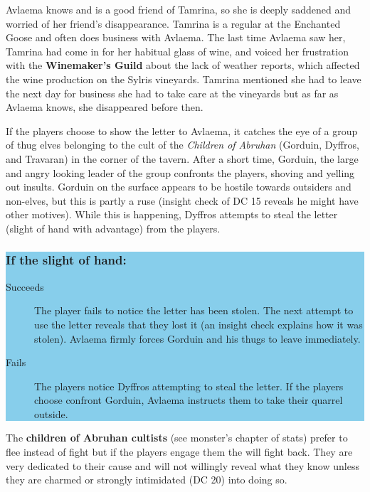 \begin{multicols*}{2}
Avlaema knows and is a good friend of Tamrina, so she is deeply saddened and worried of her friend's disappearance. Tamrina is a regular at the Enchanted Goose and often does business with Avlaema. The last time Avlaema saw her, Tamrina had come in for her habitual glass of wine, and voiced her frustration with the \textbf{Winemaker's Guild} about the lack of weather reports, which affected the wine production on the Sylris vineyards. Tamrina mentioned she had to leave the next day for business she had to take care at the vineyards but as far as Avlaema knows, she disappeared before then.

If the players choose to show the letter to Avlaema, it catches the eye of a group of thug elves belonging to the cult of the \emph{Children of Abruhan} (Gorduin, Dyffros, and Travaran) in the corner of the tavern. After a short time, Gorduin, the large and angry looking leader of the group confronts the players, shoving and yelling out insults. Gorduin on the surface appears to be hostile towards outsiders and non-elves, but this is partly a ruse (insight check of DC 15 reveals he might have other motives). While this is happening, Dyffros attempts to steal the letter (slight of hand with advantage) from the players.

\colorbox{SkyBlue}{\begin{minipage}{0.4\textwidth}
		\subsubsection*{If the slight of hand:}
		\begin{description}
			\item[Succeeds] The player fails to notice the letter has been stolen. The next attempt to use the letter reveals that they lost it (an insight check explains how it was stolen). Avlaema firmly forces Gorduin and his thugs to leave immediately. 
			\item[Fails] The players notice Dyffros attempting to steal the letter. If the players choose confront Gorduin, Avlaema instructs them to take their quarrel outside.
		\end{description}
\end{minipage}}
\break

The \textbf{children of Abruhan cultists} (see monster's chapter of stats) prefer to flee instead of fight but if the players engage them the will fight back. They are very dedicated to their cause and will not willingly reveal what they know unless they are charmed or strongly intimidated (DC 20) into doing so.
\break


\end{multicols*}

